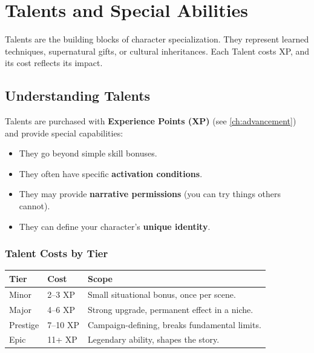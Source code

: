 \chapter{Talents and Special Abilities}
\label{ch:talents}

Talents are the building blocks of character specialization. They represent learned techniques, supernatural gifts, or cultural inheritances. Each Talent costs XP, and its cost reflects its impact.

\section{Understanding Talents}
\label{sec:talents-understanding}

Talents are purchased with \textbf{Experience Points (XP)} (see \ref{ch:advancement}) and provide special capabilities:
\begin{itemize}
\item They go beyond simple skill bonuses.
\item They often have specific \textbf{activation conditions}.
\item They may provide \textbf{narrative permissions} (you can try things others cannot).
\item They can define your character's \textbf{unique identity}.
\end{itemize}

\subsection*{Talent Costs by Tier}
\label{sec:talent-costs}

\begin{center}
\begin{tabular}{lll}
\toprule
\textbf{Tier} & \textbf{Cost} & \textbf{Scope} \\
\midrule
Minor & 2--3 XP & Small situational bonus, once per scene. \\
Major & 4--6 XP & Strong upgrade, permanent effect in a niche. \\
Prestige & 7--10 XP & Campaign-defining, breaks fundamental limits. \\
Epic & 11+ XP & Legendary ability, shapes the story. \\
\bottomrule
\end{tabular}
\end{center}

